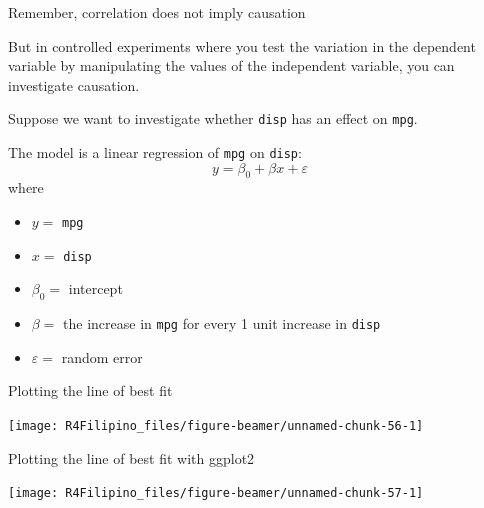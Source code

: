\begin{frame}[fragile]{Remember, correlation does not imply causation}

But in controlled experiments where you test the variation in the
dependent variable by manipulating the values of the independent
variable, you can investigate causation.

Suppose we want to investigate whether \texttt{disp} has an effect on
\texttt{mpg}.

The model is a linear regression of \texttt{mpg} on \texttt{disp}:
\[y = \beta_0 + \beta x + \varepsilon\] where

\begin{itemize}
\tightlist
\item
  \(y=\) \texttt{mpg}
\item
  \(x=\) \texttt{disp}
\item
  \(\beta_0=\) intercept
\item
  \(\beta=\) the increase in \texttt{mpg} for every 1 unit increase in
  \texttt{disp}
\item
  \(\varepsilon=\) random error
\end{itemize}

\end{frame}

\begin{frame}[fragile]{Plotting the line of best fit}

\begin{Shaded}
\begin{Highlighting}[]
\StringTok{ }\OperatorTok{~}
\end{Highlighting}
\end{Shaded}

\begin{center}\texttt{[image: R4Filipino\_files/figure-beamer/unnamed-chunk-56-1]} \end{center}

\end{frame}

\begin{frame}[fragile]{Plotting the line of best fit with ggplot2}

\begin{Shaded}
\begin{Highlighting}[]
\OperatorTok{+}\StringTok{ }\NormalTok{() }\OperatorTok{+}\StringTok{ }\NormalTok{(}\NormalTok{, }\NormalTok{)}
\end{Highlighting}
\end{Shaded}

\begin{center}\texttt{[image: R4Filipino\_files/figure-beamer/unnamed-chunk-57-1]} \end{center}

\end{frame}

